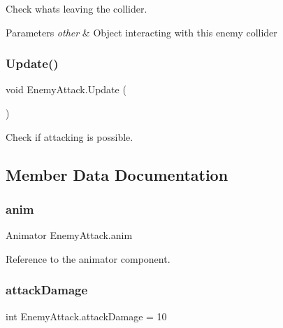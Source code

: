 Check what\textquotesingle{}s leaving the collider. 


\begin{DoxyParams}{Parameters}
{\em other} & Object interacting with this enemy collider \\
\hline
\end{DoxyParams}
\mbox{\label{class_enemy_attack_a1126b50974e33d82218df74b63836fb2}} 
\subsubsection{\texorpdfstring{Update()}{Update()}}
{\footnotesize\ttfamily void Enemy\+Attack.\+Update (\begin{DoxyParamCaption}{ }\end{DoxyParamCaption})\hspace{0.3cm}{\ttfamily [private]}}



Check if attacking is possible. 



\subsection{Member Data Documentation}
\mbox{\label{class_enemy_attack_ac159cd8983d8b95eb0fd0ad822bee0d4}} 
\subsubsection{\texorpdfstring{anim}{anim}}
{\footnotesize\ttfamily Animator Enemy\+Attack.\+anim\hspace{0.3cm}{\ttfamily [private]}}

Reference to the animator component. \mbox{\label{class_enemy_attack_a852a4228aea3ebb66a3b5b6498dcee67}} 
\subsubsection{\texorpdfstring{attackDamage}{attackDamage}}
{\footnotesize\ttfamily int Enemy\+Attack.\+attack\+Damage = 10}

